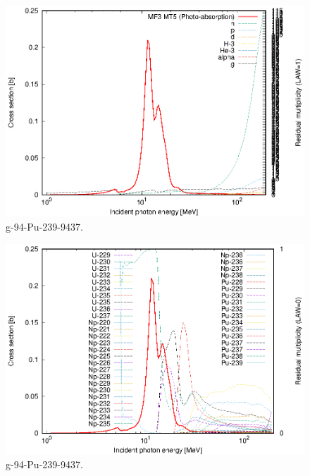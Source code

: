\begin{figure}
 \includegraphics[width=\linewidth]{eps/g_94-Pu-239_9437.eps}
  \caption{g-94-Pu-239-9437.}
\end{figure}
\begin{figure}
 \includegraphics[width=\linewidth]{eps-law0/g_94-Pu-239_9437.eps}
 \caption{g-94-Pu-239-9437.}
\end{figure}
\newpage \clearpage

